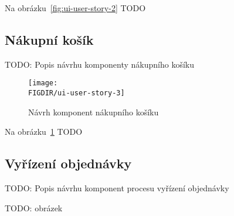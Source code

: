Na obrázku~\ref{fig:ui-user-story-2} TODO

\subsection{Nákupní košík}
\label{subsec:narvh-ui-transformace-uzivatelskych-pribehu-nakupni-kosik}
\userstoryseatselection

TODO: Popis návrhu komponenty nákupního košíku

\begin{figure}[hbt]
    \centering
    \texttt{[image: \\FIGDIR/ui-user-story-3]}
    \caption{Návrh komponent nákupního košíku}
    \label{fig:ui-user-story-3}
\end{figure}

Na obrázku~\ref{fig:ui-user-story-3} TODO

\subsection{Vyřízení objednávky}
\label{subsec:narvh-ui-transformace-uzivatelskych-pribehu-vyrizeni-objednavky}
\userstoryseatselection

TODO: Popis návrhu komponent procesu vyřízení objednávky

TODO: obrázek
